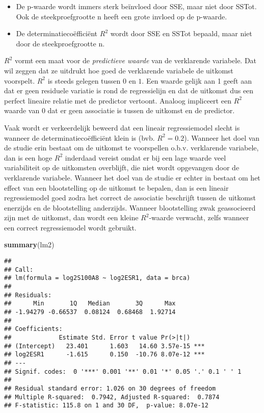\documentclass[
  12pt,dutch,coursenotes]{book}
\newenvironment{Shaded}{\begin{snugshade}}{\end{snugshade}}
\newcommand{\KeywordTok}[1]{\textcolor[rgb]{0.13,0.29,0.53}{\textbf{#1}}}
\newcommand{\NormalTok}[1]{#1}
\providecommand{\tightlist}{%
  \setlength{\itemsep}{0pt}\setlength{\parskip}{0pt}}
\theoremstyle{definition}
\theoremstyle{definition}
\theoremstyle{definition}
\theoremstyle{remark}
\begin{document}
\begin{itemize}
\tightlist
\item
  De p-waarde wordt immers sterk beïnvloed door SSE, maar niet door SSTot. Ook de steekproefgrootte n heeft een grote invloed op de p-waarde.
\item
  De determinatiecoëfficiënt \(R^2\) wordt door SSE en SSTot bepaald, maar niet door de steekproefgrootte n.
\end{itemize}

\(R^2\) vormt een maat voor de \emph{predictieve waarde} van de verklarende variabele.
Dat wil zeggen dat ze uitdrukt hoe goed de verklarende variabele de uitkomst voorspelt.
\(R^2\) is steeds gelegen tussen \(0\) en \(1\). Een waarde gelijk aan 1 geeft aan dat er geen residuele variatie is rond de regressielijn en dat de
uitkomst dus een perfect lineaire relatie met de predictor vertoont. Analoog impliceert een \(R^2\) waarde van 0 dat er geen associatie is tussen de uitkomst en de predictor.

Vaak wordt er verkeerdelijk beweerd dat een lineair regressiemodel slecht is wanneer de determinatiecoëfficiënt klein is (bvb. \(R^2=0.2\)).
Wanneer het doel van de studie erin bestaat om de uitkomst te voorspellen o.b.v. verklarende variabele, dan is een hoge \(R^2\) inderdaad vereist omdat er bij een lage waarde veel variabiliteit op de uitkomsten overblijft, die niet wordt opgevangen door de verklarende variabele. Wanneer het doel van de studie er echter in bestaat om het effect van een blootstelling op de uitkomst te bepalen, dan is een lineair regressiemodel goed zodra het correct de associatie beschrijft tussen de uitkomst enerzijds en de blootstelling anderzijds.
Wanneer blootstelling zwak geassocieerd zijn met de uitkomst, dan wordt een kleine \(R^2\)-waarde verwacht, zelfs wanneer een correct regressiemodel wordt gebruikt.

\begin{Shaded}
\begin{Highlighting}[]
\KeywordTok{summary}\NormalTok{(lm2)}
\end{Highlighting}
\end{Shaded}

\begin{verbatim}
## 
## Call:
## lm(formula = log2S100A8 ~ log2ESR1, data = brca)
## 
## Residuals:
##      Min       1Q   Median       3Q      Max 
## -1.94279 -0.66537  0.08124  0.68468  1.92714 
## 
## Coefficients:
##             Estimate Std. Error t value Pr(>|t|)    
## (Intercept)   23.401      1.603   14.60 3.57e-15 ***
## log2ESR1      -1.615      0.150  -10.76 8.07e-12 ***
## ---
## Signif. codes:  0 '***' 0.001 '**' 0.01 '*' 0.05 '.' 0.1 ' ' 1
## 
## Residual standard error: 1.026 on 30 degrees of freedom
## Multiple R-squared:  0.7942, Adjusted R-squared:  0.7874 
## F-statistic: 115.8 on 1 and 30 DF,  p-value: 8.07e-12
\end{verbatim}
\end{document}

